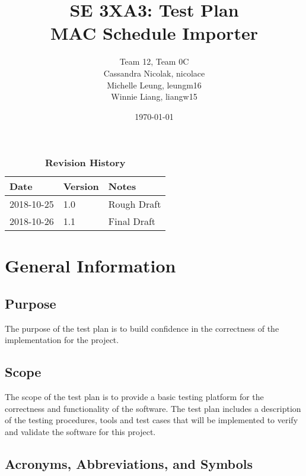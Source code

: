 \documentclass[12pt, titlepage]{article}
\title{SE 3XA3: Test Plan\\MAC Schedule Importer}
\author{Team 12, Team 0C
		\\ Cassandra Nicolak, nicolace
		\\ Michelle Leung, leungm16
		\\ Winnie Liang, liangw15
}
\date{\today}
\begin{document}
\maketitle

\tableofcontents
\listoftables
\listoffigures

\begin{table}[bp]
\caption{\bf Revision History}
\begin{tabularx}{\textwidth}{p{3cm}p{2cm}X}
\toprule {\bf Date} & {\bf Version} & {\bf Notes}\\
\midrule
2018-10-25 & 1.0 & Rough Draft\\
2018-10-26 & 1.1 & Final Draft\\
\bottomrule
\end{tabularx}
\end{table}

\newpage



\section{General Information}

\subsection{Purpose}
The purpose of the test plan is to build confidence in the correctness of the implementation for the project. 

\subsection{Scope}
The scope of the test plan is to provide a basic testing platform for the correctness and functionality of the software. The test plan includes a description of the testing procedures, tools and test cases that will be implemented to verify and validate the software for this project.
\subsection{Acronyms, Abbreviations, and Symbols}
	
\end{document}
